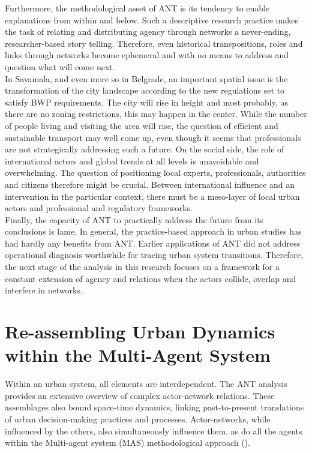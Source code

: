 \documentclass[11pt]{report}
\begin{document}
Furthermore, the methodological asset of ANT is its tendency to enable explanations from within and below.
Such a descriptive research practice makes the task of relating and distributing agency through networks a never-ending, researcher-based story telling.
Therefore, even historical transpositions, roles and links through networks become ephemeral and with no means to address and question what will come next.
\\
 
In Savamala, and even more so in Belgrade, an important spatial issue is the transformation of the city landscape according to the new regulations set to satisfy BWP requirements. The city will rise in height and most probably, as there are no zoning restrictions, this may happen in the center. While the number of people living and visiting the area will rise, the question of efficient and sustainable transport may well come up, even though it seems that professionals are not strategically addressing such a future. On the social side, the role of international actors and global trends at all levels is unavoidable and overwhelming. The question of positioning local experts, professionals, authorities and citizens therefore might be crucial. Between international influence and an intervention in the particular context, there must be a meso-layer of local urban actors and professional and regulatory frameworks.
\\

Finally, the capacity of ANT to practically address the future from its conclusions is lame. In general, the practice-based approach in urban studies has had hardly any benefits from ANT. Earlier applications of ANT did not address operational diagnosis worthwhile for tracing urban system transitions. Therefore, the next stage of the analysis in this research focuses on a framework for a constant extension of agency and relations when the actors collide, overlap and interfere in networks. 

\chapter{Re-assembling Urban Dynamics within the Multi-Agent System}


Within an urban system, all elements are interdependent. The ANT analysis provides an extensive overview of complex actor-network relations. These assemblages also bound space-time dynamics, linking past-to-present translations of urban decision-making practices and processes. Actor-networks, while influenced by the others, also simultaneously influence them, as do all the agents within the Multi-agent system (MAS) methodological approach (\href{Bousquet}{\citealt{bousquet_multi-agent_2004}}).
\\
\end{document}
